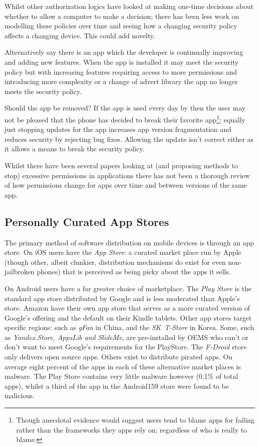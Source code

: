 \documentclass[a4paper]{article}
\begin{document}
Whilst other authorization logics have looked at making one-time decisions about
whether to allow a computer to make a decision; there has been less work on
modelling these policies over time and seeing how a changing security policy
affects a changing device.  This could add novelty.

Alternatively say there is an app which the developer is continually improving
and adding new features.  When the app is installed it may meet the security
policy but with increasing features requiring access to more permissions and
introducing more complexity or a change of advert library the app no longer
meets the security policy.

Should the app be removed?  If the app is used every day by then the user may
not be pleased that the phone has decided to break their favorite
app\footnote{Though anecdotal evidence would suggest users tend to blame apps
  for failing rather than the frameworks they apps rely on; regardless of who is
  really to blame.}; equally just stopping updates for the app increases app
version fragmentation and reduces security by rejecting bug fixes.  Allowing the
update isn't correct either as it allows a means to break the security policy.

Whilst there have been several papers looking at (and proposing methods to stop)
excessive permissions in applications\cite{Felt:2011kj}\cite{Vidas:2011wr} there
has not been a thorough review of how permissions change for apps over time
and between versions of the same app. 



\subsection{Personally Curated App Stores}

The primary method of software distribution on mobile devices is through an app
store.  On iOS users have the \emph{App Store}: a curated market place run by
Apple (though other, albeit clunkier, distribution mechanisms do exist for even
non-jailbroken phones) that is perceived as being picky about the apps it sells.

On Android users have a far greater choice of marketplace.  The \emph{Play
  Store} is the standard app store distributed by Google and is less moderated
than Apple's store.  Amazon have their own app store that serves as a more
curated version of Google's offering and the default on their Kindle tablets.
Other app stores target specific regions: such as \emph{gFan} in China, and the
\emph{SK~T-Store} in Korea.  Some, such as \emph{Yandex.Store, AppsLib and
  SlideMe}, are pre-installed by OEMS who can't or don't want to meet Google's
requirements for the PlayStore.  The \emph{F-Droid} store only delivers open
source apps. Others exist to distribute pirated apps.  On average eight
percent\cite{AQUILINO:2013wr} of the apps in each of these alternative market
places is malware. The Play Store contains very little malware however (0.1\% of
total apps), whilst a third of the app in the Android159 store were found to be
malicious.
\end{document}
